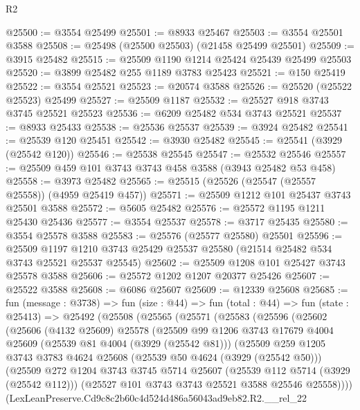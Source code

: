 \begin{lexlean}{R2}
\begin{coremodule}
@25500 := @3554 @25499
@25501 := @8933 @25467
@25503 := @3554 @25501 @3588
@25508 := @25498 (@25500 @25503) (@21458 @25499 @25501)
@25509 := @3915 @25482
@25515 := @25509 @1190 @1214 @25424 @25439 @25499 @25503
@25520 := @3899 @25482 @255 @1189 @3783 @25423
@25521 := @150 @25419
@25522 := @3554 @25521
@25523 := @20574 @3588
@25526 := @25520 (@25522 @25523) @25499
@25527 := @25509 @1187
@25532 := @25527 @918 @3743 @3745 @25521 @25523
@25536 := @6209 @25482 @534 @3743 @25521
@25537 := @8933 @25433
@25538 := @25536 @25537
@25539 := @3924 @25482
@25541 := @25539 @120 @25451
@25542 := @3930 @25482
@25545 := @25541 (@3929 (@25542 @120))
@25546 := @25538 @25545
@25547 := @25532 @25546
@25557 := @25509 @459 @101 @3743 @3743 @458 @3588 (@3943 @25482 @53 @458)
@25558 := @3973 @25482
@25565 := @25515 (@25526 (@25547 (@25557 @25558)) (@4959 @25419 @457))
@25571 := @25509 @1212 @101 @25437 @3743 @25501 @3588
@25572 := @5605 @25482
@25576 := @25572 @1195 @1211 @25430 @25436
@25577 := @3554 @25537
@25578 := @3717 @25435
@25580 := @3554 @25578 @3588
@25583 := @25576 (@25577 @25580) @25501
@25596 := @25509
    @1197
    @1210
    @3743
    @25429
    @25537
    @25580
    (@21514 @25482 @534 @3743 @25521 @25537 @25545)
@25602 := @25509 @1208 @101 @25427 @3743 @25578 @3588
@25606 := @25572 @1202 @1207 @20377 @25426
@25607 := @25522 @3588
@25608 := @6086 @25607
@25609 := @12339 @25608
@25685 := fun (message : @3738) =>
  fun (size : @44) =>
  fun (total : @44) =>
  fun (state : @25413) =>
  @25492
    (@25508
      (@25565
        (@25571
          (@25583
            (@25596
              (@25602
                (@25606
                  (@4132 @25609)
                  @25578
                  (@25509
                    @99
                    @1206
                    @3743
                    @17679
                    @4004
                    @25609
                    (@25539 @81 @4004 (@3929 (@25542 @81)))
                    (@25509
                      @259
                      @1205
                      @3743
                      @3783
                      @4624
                      @25608
                      (@25539 @50 @4624 (@3929 (@25542 @50)))
                      (@25509
                        @272
                        @1204
                        @3743
                        @3745
                        @5714
                        @25607
                        (@25539 @112 @5714 (@3929 (@25542 @112)))
                        (@25527 @101 @3743 @3743 @25521 @3588 @25546 @25558))))
                  (LexLeanPreserve.Cd9c8c2b60c4d524d486a56043ad9eb82.R2.__rel_22

\end{coremodule}
\end{lexlean}
